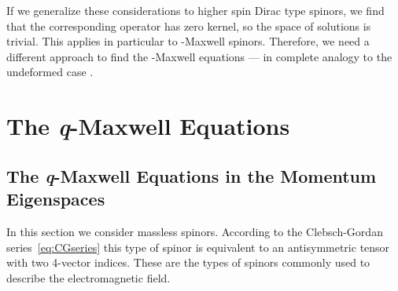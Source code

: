 \documentclass[12pt,a4paper]{article}
\begin{document}
If we generalize these considerations to higher spin \coordHE{} Dirac type spinors, we find that the corresponding operator
\coordHE{} has zero kernel, so the space of solutions is trivial.
This applies in particular to \coordHE{}-Maxwell spinors. Therefore, we need
a different approach to find the \coordHE{}-Maxwell equations --- in complete
analogy to the undeformed case \cite{BarutRaczka}.


\section{The \textit{q}-Maxwell Equations}
\label{sec:MainContrib4c}

\subsection{The \textit{q}-Maxwell Equations in the Momentum
  Ei\-gen\-spa\-ces}

In this section we consider massless \coordHE{}
spinors. According to the Clebsch-Gordan series~\eqref{eq:CGseries}
this type of spinor is equivalent to an antisymmetric tensor
\coordHE{} with two 4-vector indices. These are the types of spinors
commonly used to describe the electromagnetic field.
\end{document}
